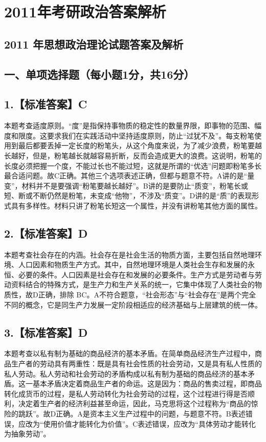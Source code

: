 \documentclass[UTF8,11pt]{ctexart}
\begin{document}
\section*{2011年考研政治答案解析}
\subsection*{2011 年思想政治理论试题答案及解析}

\subsection*{一、单项选择题（每小题1分，共16分）}

\subsection*{1.【标准答案】C}

本题考查适度原则。“度”是指保持事物质的稳定性的数量界限，即事物的范围、幅度和限度。这要求我们在实践活动中坚持适度原则，防止“过犹不及”。每支粉笔使用到最后都要丢掉一定长度的粉笔头，从这个角度来说，为了减少浪费，粉笔要越长越好，但是，粉笔越长就越容易折断，反而会造成更大的浪费。这说明，粉笔的长度必须把握一个度，不能过长也不能过短，这就是所谓的“优选”问题即粉笔多长最合适问题。故C正确。其他三个选项表述正确，但都与题意不符。A讲的是“量变”，材料并不是要强调“粉笔要越长越好”。B讲的是要防止“质变”，粉笔长或短、断或不断仍然是粉笔，未变成“他物”，不涉及“质变”。D讲的是“质”的表现形式具有多样性。材料只讲了粉笔长短这一个属性，并没有讲粉笔其他方面的属性。


\subsection*{2.【标准答案】D}

本题考查社会存在的内涵。社会存在是社会生活的物质方面，主要包括自然地理环境、人口因素和物质生产方式。其中，自然地理环境是人类社会生存和发展的永恒、必要的条件。人口因素是社会存在和发展的必要条件。生产方式是劳动者与劳动资料结合的特殊方式，是生产力和生产关系的统一，它集中体现了人类社会的物质性，故D正确，排除 BC。A不符合题意，“社会形态”与“社会存在”是两个完全不同的概念，它是同生产力发展一定阶段相适应的经济基础与上层建筑的统一体。


\subsection*{3.【标准答案】D}

本题考查以私有制为基础的商品经济的基本矛盾。在简单商品经济生产过程中，商品生产者的劳动具有两重性：既是具有社会性质的社会劳动，又是具有私人性质的私人劳动。私人劳动和社会劳动的矛盾构成以私有制为基础的商品经济的基本矛盾。这一基本矛盾决定着商品生产者的命运。这是因为：商品的售卖过程，即商品转化成货币的过程，是私人劳动转化为社会劳动的过程，这个过程进行得是否顺利，决定着生产者的经济利益甚至命运，因此，马克思将这个过程称为“商品的惊险的跳跃”。故D正确。A是资本主义生产过程中的问题，与题意不符。B表述错误，应改为“使用价值才能转化为价值”。C表述错误，应改为“具体劳动才能转化为抽象劳动”。
\end{document}

